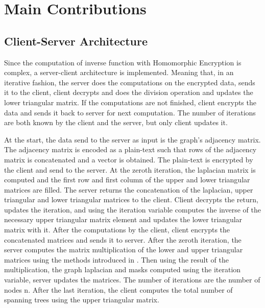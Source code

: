 \documentclass{winslabreport}
\begin{document}
\section{Main Contributions}

\subsection{Client-Server Architecture}
Since the computation of inverse function with Homomorphic Encryption is complex, a server-client architecture is implemented. Meaning that, in an iterative fashion, the server does the computations on the encrypted data, sends it to the client, client decrypts and does the division operation and updates the lower triangular matrix. If the computations are not finished, client encrypts the data and sends it back to server for next computation. The number of iterations are both known by the client and the server, but only client updates it.

At the start, the data send to the server as input is the graph's adjacency matrix. The adjacency matrix is encoded as a plain-text such that rows of the adjacency matrix is concatenated and a vector is obtained. The plain-text is encrypted by the client and send to the server. At the zeroth iteration, the laplacian matrix is computed and the first row and first column of the upper and lower triangular matrices are filled. The server returns the concatenation of the laplacian, upper triangular and lower triangular matrices to the client. Client decrypts the return, updates the iteration, and using the iteration variable computes the inverse of the necessary upper triangular matrix element and updates the lower triangular matrix with it. After the computations by the client, client encrypts the concatenated matrices and sends it to server. After the zeroth iteration, the server computes the matrix multiplication of the lower and upper triangular matrices using the methods introduced in \cite{10.1145/3243734.3243837}. Then using the result of the multiplication, the graph laplacian and masks computed using the iteration variable, server updates the matrices. The number of iterations are the number of nodes n. After the last iteration, the client computes the total number of spanning trees using the upper triangular matrix.

%
\end{document}
